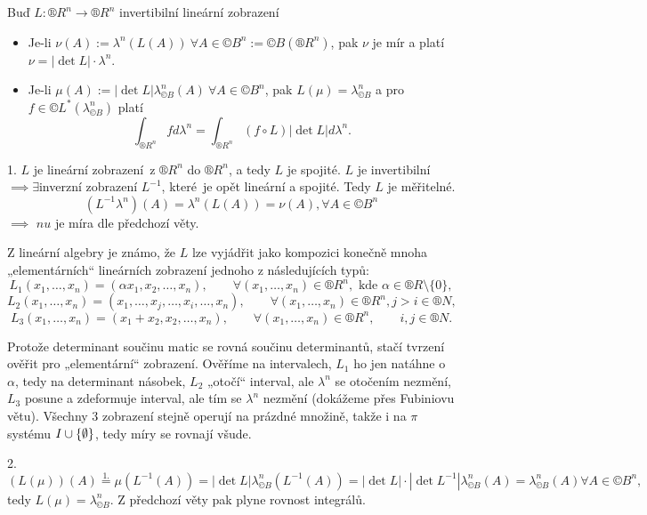 \documentclass[12pt]{article}					%
\begin{document}
\begin{veta}
	Buď $L: ®R^n \rightarrow ®R^n$ invertibilní lineární zobrazení

	\begin{itemize}
		\item Je-li $\nu(A) := \lambda^n(L(A))\ \forall A \in ©B^n := ©B(®R^n)$, pak $\nu$ je mír a platí $\nu = |\det L|·\lambda^n$.
		\item Je-li $\mu(A) := |\det L|\lambda_{©B}^n(A)\ \forall A \in ©B^n$, pak $L(\mu) = \lambda_{©B}^n$ a pro $f \in ©L^*(\lambda_{©B}^n)$ platí
			$$ \int_{®R^n} f d\lambda^n = \int_{®R^n} (f \circ L) |\det L| d\lambda^n. $$
	\end{itemize}

	\begin{dukazin}
		1. $L$ je lineární zobrazení z $®R^n$ do $®R^n$, a tedy $L$ je spojité. $L$ je invertibilní $\implies \exists$inverzní zobrazení $L^{-1}$, které je opět lineární a spojité. Tedy $L$ je měřitelné.
		$$ (L^{-1}\lambda^n)(A) = \lambda^n(L(A)) = \nu(A), \forall A \in ©B^n $$
		$\implies$ $nu$ je míra dle předchozí věty.

		Z lineární algebry je známo, že $L$ lze vyjádřit jako kompozici konečně mnoha „elementárních“ lineárních zobrazení jednoho z následujících typů:
		$$ L_1(x_1, …, x_n) = (\alpha x_1, x_2, …, x_n), \qquad \forall (x_1, …, x_n) \in ®R^n, \text{ kde }\alpha \in ®R\setminus\{0\}, $$
		$$ L_2(x_1, …, x_n) = (x_1, …, x_j, …, x_i, …, x_n), \qquad \forall (x_1, …, x_n) \in ®R^n, j > i \in ®N, $$
		$$ L_3(x_1, …, x_n) = (x_1 + x_2, x_2, …, x_n), \qquad \forall (x_1, …, x_n) \in ®R^n, \qquad i, j \in ®N. $$

		Protože determinant součinu matic se rovná součinu determinantů, stačí tvrzení ověřit pro „elementární“ zobrazení. Ověříme na intervalech, $L_1$ ho jen natáhne o $\alpha$, tedy na determinant násobek, $L_2$ „otočí“ interval, ale $\lambda^n$ se otočením nezmění, $L_3$ posune a zdeformuje interval, ale tím se $\lambda^n$ nezmění (dokážeme přes Fubiniovu větu). Všechny 3 zobrazení stejně operují na prázdné množině, takže i na $\pi$ systému $I \cup \{\emptyset\}$, tedy míry se rovnají všude.

		2.
		$$ (L(\mu))(A) \overset{1.}{=} \mu(L^{-1}(A)) = |\det L| \lambda_{©B}^n(L^{-1}(A)) = |\det L|·|\det L^{-1}| \lambda_{©B}^n(A) = \lambda_{©B}^n(A) \forall A \in ©B^n, $$
		tedy $L(\mu) = \lambda_{©B}^n$. Z předchozí věty pak plyne rovnost integrálů.
	\end{dukazin}
\end{veta}
\end{document}
